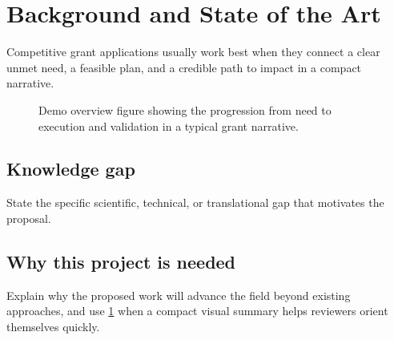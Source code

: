 \section{Background and State of the Art}

Competitive grant applications usually work best when they connect a
clear unmet need, a feasible plan, and a credible path to impact in a
compact narrative.\citep{demo2025workflow}

\begin{figure}[t]
  \centering
  
  \caption{Demo overview figure showing the progression from need to
  execution and validation in a typical grant narrative.}
  \label{fig:demo-workflow}
\end{figure}

\subsection{Knowledge gap}

State the specific scientific, technical, or translational gap that
motivates the proposal.

\subsection{Why this project is needed}

Explain why the proposed work will advance the field beyond existing
approaches, and use \cref{fig:demo-workflow} when a compact visual
summary helps reviewers orient themselves quickly.
